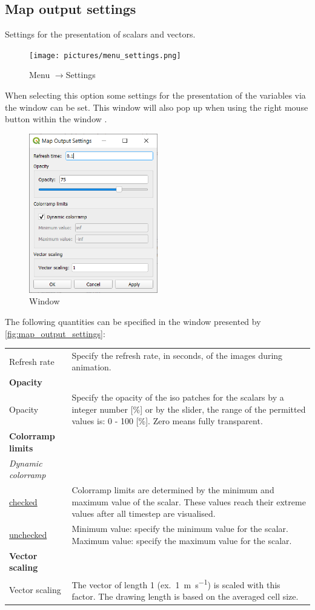\documentclass{deltares_memo}
\newcommand{\menuarrow}{$\rightarrow$}
\begin{document}
\subsection{Map output settings\label{sec:map_output_settings}}
Settings for the presentation of scalars and vectors.
\begin{figure}[H]
    \centering    
    \texttt{[image: pictures/menu\_settings.png]}
    \caption{Menu \menuarrow Settings}
\end{figure}
When selecting this option some settings for the presentation of the variables via the window  can be set. 
This window will also pop up when using the right mouse button within the window .
\begin{figure}[H]
	\centering    
	\includegraphics[width=0.50\textwidth]{pictures/map_output_settings.png}
	\caption{Window \label{fig:map_output_settings}}
\end{figure}
The following quantities can be specified in the window presented by \autoref{fig:map_output_settings}:
\begin{longtable}{p{35mm-12pt} p{\textwidth-35mm-12pt}} 
	Refresh rate & Specify the refresh rate, in seconds, of the images during animation. \\	
	\textbf{Opacity} & \\
	Opacity & Specify the opacity of the iso patches for the scalars by a integer number [\%] or by the slider, the range of the permitted values is: 0 - 100 [\%]. Zero means fully transparent.\\
	\textbf{Colorramp limits} & \\
	\textsl{Dynamic colorramp} & \\
	\underline{checked} & Colorramp limits are determined by the minimum and maximum value of the scalar. 
	These values reach their extreme values after all timestep are visualised.\\
	\underline{unchecked} & 
	Minimum value: \quad specify the minimum value for the scalar.\newline
	Maximum value: \quad specify the maximum value for the scalar.\\
	\textbf{Vector scaling} & \\
	Vector scaling & The vector of length 1 (ex.\ \SI{1}{\metre\per\second}) is scaled with this factor. The drawing length is based on the averaged cell size.
\end{longtable}
\end{document}
